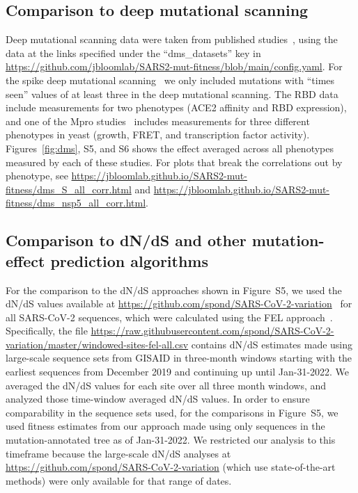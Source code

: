 \documentclass[9pt,twocolumn,twoside]{gsajnl_modified}
\begin{document}
{\subsection{Comparison to deep mutational scanning}
Deep mutational scanning data were taken from published studies~\citep{dadonaite2023pseudovirus,starr2022deep,flynn2022,flynn2023,iketani2022functional}, using the data at the links specified under the ``dms\_datasets'' key in \url{https://github.com/jbloomlab/SARS2-mut-fitness/blob/main/config.yaml}.
For the spike deep mutational scanning~\citep{dadonaite2023pseudovirus} we only included mutations with ``times seen'' values of at least three in the deep mutational scanning.
The RBD data~\citep{starr2022deep} include measurements for two phenotypes (ACE2 affinity and RBD expression), and one of the Mpro studies~\citep{flynn2022} includes measurements for three different phenotypes in yeast (growth, FRET, and transcription factor activity).
Figures~\ref{fig:dms}, S5, and S6 shows the effect averaged across all phenotypes measured by each of these studies.
For plots that break the correlations out by phenotype, see \url{https://jbloomlab.github.io/SARS2-mut-fitness/dms_S_all_corr.html} and \url{https://jbloomlab.github.io/SARS2-mut-fitness/dms_nsp5_all_corr.html}.

\subsection{Comparison to dN/dS and other mutation-effect prediction algorithms}
For the comparison to the dN/dS approaches shown in Figure~S5, we used the dN/dS values available at \url{https://github.com/spond/SARS-CoV-2-variation}~\cite{martin2021emergence} for all SARS-CoV-2 sequences, which were calculated using the FEL approach~\cite{kosakovsky2005not}.
Specifically, the file \url{https://raw.githubusercontent.com/spond/SARS-CoV-2-variation/master/windowed-sites-fel-all.csv} contains dN/dS estimates made using large-scale sequence sets from GISAID in three-month windows starting with the earliest sequences from December 2019 and continuing up until Jan-31-2022.
We averaged the dN/dS values for each site over all three month windows, and analyzed those time-window averaged dN/dS values.
In order to ensure comparability in the sequence sets used, for the comparisons in Figure~S5, we used fitness estimates from our approach made using only sequences in the mutation-annotated tree as of Jan-31-2022.
We restricted our analysis to this timeframe because the large-scale dN/dS analyses at \url{https://github.com/spond/SARS-CoV-2-variation} (which use state-of-the-art methods) were only available for that range of dates.

}
\end{document}
